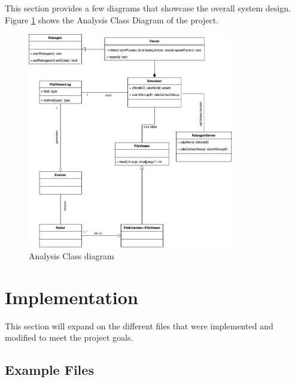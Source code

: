 \documentclass[11pt,a4paper]{article}
\begin{document}
This section provides a few diagrams that showcase the overall system design.
Figure \ref{fig:analysis-class-diagram} shows the Analysis Class Diagram of the
project.

\begin{figure}[htpb]
    \centering
    \includegraphics[width=0.8\textwidth]{1}
    \caption{Analysis Class diagram}
    \label{fig:analysis-class-diagram}
\end{figure}

\section{Implementation}
This section will expand on the different files that were implemented and
modified to meet the project goals.

\subsection{Example Files}
\end{document}
